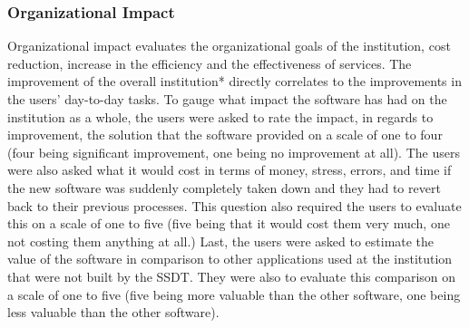 \subsubsection{Organizational Impact}
Organizational impact evaluates the organizational goals of the institution, cost reduction, increase in the efficiency and the effectiveness of services. The improvement of the overall institution* directly correlates to the improvements in the users' day-to-day tasks. To gauge what impact the software has had on the institution as a whole, the users were asked to rate the impact, in regards to improvement, the solution that the software provided on a scale of one to four (four being significant improvement, one being no improvement at all). The users were also asked what it would cost in terms of money, stress, errors, and time if the new software was suddenly completely taken down and they had to revert back to their previous processes. This question also required the users to evaluate this on a scale of one to five (five being that it would cost them very much, one not costing them anything at all.) Last, the users were asked to estimate the value of the software in comparison to other applications used at the institution that were not built by the SSDT. They were also to evaluate this comparison on a scale of one to five (five being more valuable than the other software, one being less valuable than the other software).


